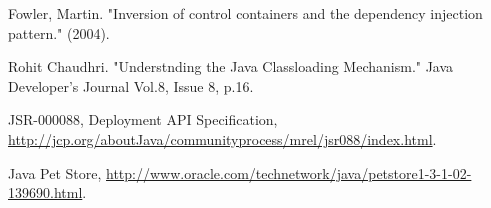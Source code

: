 \documentclass[conference]{IEEEtran}
\begin{document}
\begin{thebibliography}{9}
Fowler, Martin. "Inversion of control containers and the dependency injection pattern." (2004).


Rohit Chaudhri. "Understnding the Java Classloading Mechanism." Java Developer's Journal Vol.8, Issue 8, p.16.


JSR-000088, Deployment API Specification, \url{http://jcp.org/aboutJava/communityprocess/mrel/jsr088/index.html}.

Java Pet Store, \url{http://www.oracle.com/technetwork/java/petstore1-3-1-02-139690.html}.











\end{thebibliography}
\end{document}
